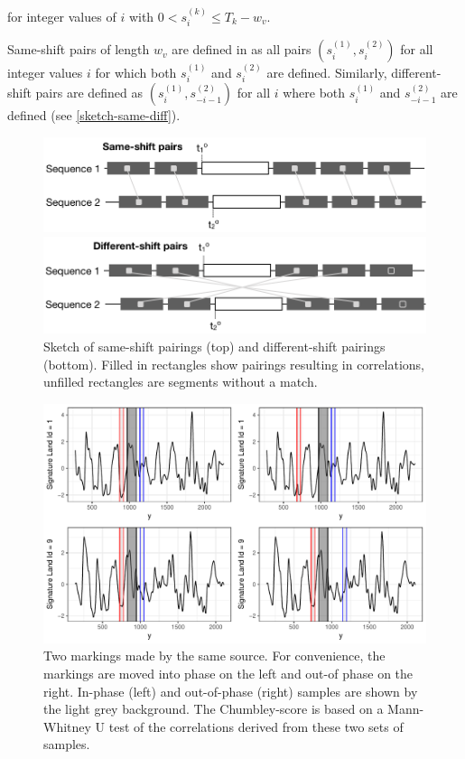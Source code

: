 \documentclass[12pt]{article}
\begin{document}
for integer values of \(i\) with \(0 < s^{(k)}_i \le T_k - w_v\).

Same-shift pairs of length \(w_v\) are defined in \citet{hadler} as all
pairs \((s_i^{(1)}, s_i^{(2)})\) for all integer values \(i\) for which
both \(s_i^{(1)}\) and \(s_i^{(2)}\) are defined. Similarly,
different-shift pairs are defined as \((s_i^{(1)}, s_{-i-1}^{(2)})\) for
all \(i\) where both \(s_i^{(1)}\) and \(s_{-i-1}^{(2)}\) are defined
(see \autoref{sketch-same-diff}).

\begin{figure}[hbtp]
\centering
\includegraphics[width=.7\textwidth]{images/sketch-same.png}

\includegraphics[width=.7\textwidth]{images/sketch-diff.png}
\caption{\label{sketch-same-diff}Sketch of same-shift pairings  (top) and different-shift pairings (bottom). Filled in rectangles show pairings resulting in correlations, unfilled rectangles are segments without a match.}
\end{figure}

\begin{figure}

{\centering \includegraphics[width=\textwidth]{figures/win-comparison-1} 

}

\caption{Two markings made by the same source. For convenience, the markings are moved into phase on the left and out-of phase on the right. In-phase (left) and out-of-phase (right) samples are shown by the light grey background. The Chumbley-score is based on a Mann-Whitney U test of the correlations derived from these two sets of samples.}\label{fig:win-comparison}
\end{figure}
\end{document}
